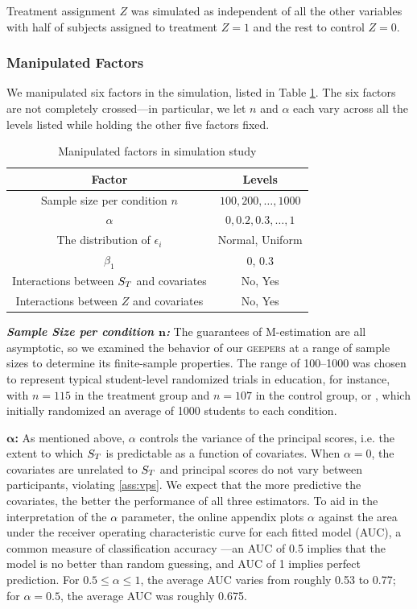 \documentclass[]{article}
\begin{document}
Treatment assignment $Z$ was simulated as independent of all the other variables with half of subjects assigned to treatment $Z=1$ and the rest to control $Z=0$.


\subsubsection{Manipulated Factors}
We manipulated six factors in the simulation, listed in Table \ref{tab:factor}.
The six factors are not completely crossed---in particular, we let $n$ and $\alpha$ each vary across all the levels listed while holding the other five factors fixed.

\begin{table}
    \caption{\label{tab:factor} Manipulated factors in simulation study}
  \centering
\begin{tabular}{*{2}{c}}
  \hline
  Factor &Levels\\
  \hline
Sample size per condition $n$ &$100,200,\dots,1000$\\
$\alpha$ &$0,0.2,0.3,\dots,1$\\
The distribution of $\epsilon_i$& Normal, Uniform\\
$\beta_1$ & 0, 0.3\\
Interactions between $S_T$ and covariates & No, Yes\\
Interactions between $Z$ and covariates& No, Yes\\
\hline
\end{tabular}
\end{table}

\textbf{\emph{Sample Size per condition $\bm{n}$:}} The guarantees of M-estimation are all asymptotic, so we examined the behavior of our \textsc{geepers} at a range of sample sizes to determine its finite-sample properties. The range of 100--1000 was chosen to represent typical student-level randomized trials in education, for instance, \citet{growthMindsetRuralBurnette} with $n=115$ in the treatment group and $n=107$ in the control group, or \citet{impactPaper}, which initially randomized an average of 1000 students to each condition.

$\bm{\alpha}$\textbf{:} As mentioned above, $\alpha$ controls the variance of the principal scores, i.e. the extent to which $S_T$ is predictable as a function of covariates. When $\alpha=0$, the covariates are unrelated to $S_T$ and principal scores do not vary between participants, violating \eqref{ass:vps}. We expect that the more predictive the covariates, the better the performance of all three estimators.
To aid in the interpretation of the $\alpha$ parameter, the online appendix plots $\alpha$ against the area under the receiver operating characteristic curve for each fitted model (AUC), a common measure of classification accuracy \citep{bradley1997use}---an AUC of 0.5 implies that the model is no better than random guessing, and AUC of 1 implies perfect prediction. For $0.5\le \alpha \le 1$, the average AUC varies from roughly 0.53 to 0.77; for $\alpha=0.5$, the average AUC was roughly 0.675.
\end{document}
